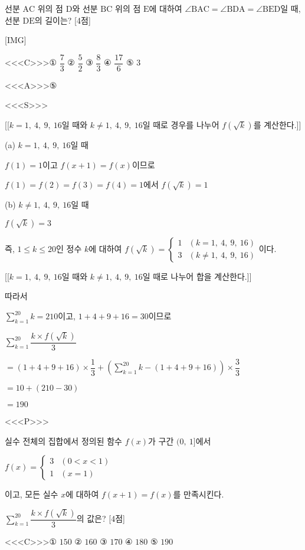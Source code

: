 \documentclass{oblivoir}
\begin{document}
선분 $\mathrm{AC}$ 위의 점 $\mathrm{D}$와 선분 $\mathrm{BC}$ 위의 점 $\mathrm{E}$에 대하여 $\angle\mathrm{BAC}=\angle\mathrm{BDA}=\angle\mathrm{BED}$일 때, 선분 $\mathrm{DE}$의 길이는? [4점]

[IMG]

<<<C>>>① $\dfrac{7}{3}$ ② $\dfrac{5}{2}$ ③ $\dfrac{8}{3}$ ④ $\dfrac{17}{6}$ ⑤ $3$

<<<A>>>⑤

<<<S>>>

[[$k=1,\:4,\:9,\:16$일 때와 $k \neq 1,\:4,\:9,\:16$일 때로 경우를 나누어 $f(\sqrt{k})$를 계산한다.]]

(a) $k=1,\:4,\:9,\:16$일 때

$f(1)=1$이고 $f(x+1)=f(x)$이므로

$f(1)=f(2)=f(3)=f(4)=1$에서 $f(\sqrt{k})=1$

(b) $k\ne 1,\:4,\:9,\:16$일 때

$f(\sqrt{k})=3$

즉, $1\le k\le 20$인 정수 $k$에 대하여 $f(\sqrt{k})=\begin{cases}
1&(k=1,\:4,\: 9,\: 16)\\
3&(k\ne 1,\:4,\: 9,\: 16)
\end{cases}$이다.

[[$k=1,\:4,\:9,\:16$일 때와 $k \neq 1,\:4,\:9,\:16$일 때로 나누어 합을 계산한다.]]

따라서

$\displaystyle\sum_{k=1}^{20}k=210$이고, $1+4+9+16=30$이므로

$\displaystyle\sum_{k=1}^{20}\dfrac{k\times f(\sqrt{k})}{3}$

$=\left( 1+4+9+16 \right) \times \dfrac{1}{3}+\left(\displaystyle\sum_{k=1}^{20} k-(1+4+9+16) \right) \times \dfrac{3}{3}$ 

$=10 +(210-30)$

$=190$

<<<P>>>

실수 전체의 집합에서 정의된 함수 $f(x)$가 구간 $(0,\:1]$에서

$f(x)=\begin{cases}
3&(0< x< 1)\\
1&(x=1)
\end{cases}$

이고, 모든 실수 $x$에 대하여 $f(x+1)=f(x)$를 만족시킨다.

$\displaystyle\sum_{k=1}^{20}\dfrac{k\times f(\sqrt{k})}{3}$의 값은? [4점]

<<<C>>>① $150$ ② $160$ ③ $170$ ④ $180$ ⑤ $190$
\end{document}

